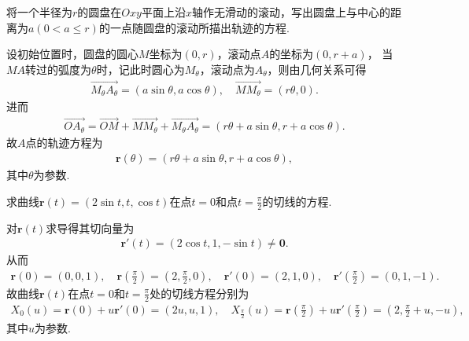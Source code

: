 \documentclass[../../main.tex]{subfiles}%
\begin{document}
\begin{example}
将一个半径为$r$的圆盘在$Oxy$平面上沿$x$轴作无滑动的滚动，写出圆盘上与中心的距离为$a(0 < a \leqslant r)$的一点随圆盘的滚动所描出轨迹的方程.
\end{example}
\begin{solution}

设初始位置时，圆盘的圆心$M$坐标为$(0,r)$，滚动点$A$的坐标为$(0,r+a)$，
当$MA$转过的弧度为$\theta$时，记此时圆心为$M_\theta$，滚动点为$A_\theta$，则由几何关系可得
\begin{align*}
\overrightarrow{M_{\theta}A_{\theta}}=(a\sin\theta,a\cos\theta),\quad \overrightarrow{MM_{\theta}}=(r\theta,0).
\end{align*}
进而
\begin{align*}
\overrightarrow{OA_{\theta}}=\overrightarrow{OM}+\overrightarrow{MM_{\theta}}+\overrightarrow{M_{\theta}A_{\theta}}=(r\theta+a\sin\theta,r+a\cos\theta).
\end{align*}
故$A$点的轨迹方程为
\begin{align*}
\boldsymbol{r}(\theta)=(r\theta+a\sin\theta,r+a\cos\theta),
\end{align*}
其中$\theta$为参数.

\end{solution}

\begin{example}
求曲线$\bm{r}(t) = (2\sin t, t, \cos t)$在点$t = 0$和点$t = \frac{\pi}{2}$的切线的方程.
\end{example}
\begin{solution}

对$\bm{r}(t)$求导得其切向量为\begin{align*}
\bm{r}'(t)=(2\cos t,1,-\sin t)\neq\bm{0}.
\end{align*}
从而\begin{align*}
\bm{r}(0)=(0,0,1),\quad \bm{r}\left(\frac{\pi}{2}\right)=\left(2,\frac{\pi}{2},0\right),\quad \bm{r}'(0)=(2,1,0),\quad \bm{r}'\left(\frac{\pi}{2}\right)=(0,1,-1).
\end{align*}
故曲线$\bm{r}(t)$在点$t=0$和$t=\frac{\pi}{2}$处的切线方程分别为\begin{align*}
X_0(u)=\bm{r}(0)+u\bm{r}'(0)=(2u,u,1),\quad X_{\frac{\pi}{2}}(u)=\bm{r}\left(\frac{\pi}{2}\right)+u\bm{r}'\left(\frac{\pi}{2}\right)=\left(2,\frac{\pi}{2}+u,-u\right),
\end{align*}
其中$u$为参数.

\end{solution}
\end{document}
